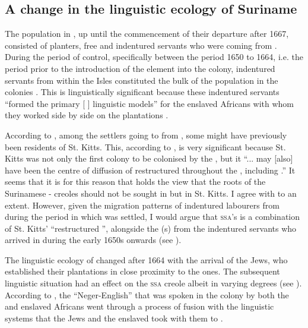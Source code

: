 \subsection {A change in the linguistic ecology of Suriname}\label{1.2.2}
The  population in , up until the commencement of their departure after 1667, consisted of planters, free  and indentured servants who were coming from  \citep{Arbell02, Sainsbury80}. During the period of  control, specifically between the period 1650 to 1664, i.e. the period prior to the introduction of the  element into the colony, indentured servants from within the  Isles constituted the bulk of the population in the  colonies \citep{Kenny06, Powell05, Armitage05}. This is linguistically significant because these indentured servants ``formed the primary [ ] linguistic models'' \citep[117]{Arends02} for the enslaved Africans with whom they worked side by side on the plantations \citep{Galenson02}.

According to \citet{Rens53}, among the settlers going to  from , some might have previously been residents of St. Kitts. This, according to \citet[117]{Arends02}, is very significant because St. Kitts was not only the first colony to be colonised by the , but it ``... may [also] have been the centre of diffusion of restructured  throughout the , including .'' It seems that it is for this reason that \citet{Arends02} holds the view that the  roots of the Surinamese - creoles should not be sought in  but in St. Kitts. I agree with \citet{Arends02} to an extent. However, given the migration patterns of indentured labourers from  during the period in which  was settled, I would argue that \textsc{ssa}'s   is a combination of St. Kitts'  ``restructured '', alongside the (s) from the indentured servants who arrived in  during the early 1650s onwards (see ).

The linguistic ecology of  changed after 1664 with the arrival of the  Jews, who established their plantations in close proximity to the  ones. The subsequent linguistic situation had an effect on the \textsc{ssa}  creole  albeit in varying degrees (see ). According to \citet{Rens53}, the ``Neger-English''  that was spoken in the colony by both the  and enslaved Africans went through a process of fusion with the  linguistic systems that the  Jews and the enslaved took with them to .

